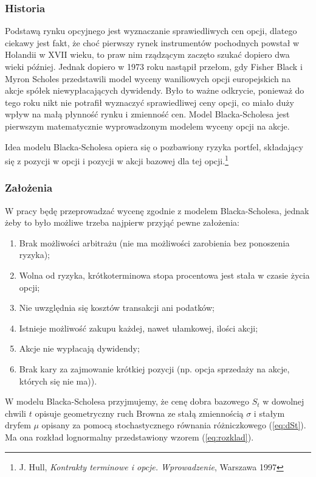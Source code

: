 \documentclass[12pt]{article}
\begin{document}
\subsubsection{Historia}
Podstawą rynku opcyjnego jest wyznaczanie sprawiedliwych cen opcji, dlatego ciekawy jest fakt, że choć pierwszy rynek instrumentów pochodnych powstał w Holandii w XVII wieku, to praw nim rządzącym zaczęto szukać dopiero dwa wieki później. Jednak dopiero w 1973 roku nastąpił przełom, gdy Fisher Black i Myron Scholes przedstawili model wyceny waniliowych opcji europejskich na akcje spółek niewypłacających dywidendy. Było to ważne odkrycie, ponieważ do tego roku nikt nie potrafił wyznaczyć sprawiedliwej ceny opcji, co miało duży wpływ na małą płynność rynku i zmienność cen. Model Blacka-Scholesa jest pierwszym matematycznie wyprowadzonym modelem wyceny opcji na akcje.

Idea modelu Blacka-Scholesa opiera się o pozbawiony ryzyka portfel, składający się z pozycji w opcji i pozycji w akcji bazowej dla tej opcji.\footnote{J. Hull, \textit{Kontrakty terminowe i opcje. Wprowadzenie}, Warszawa 1997}

\subsubsection{Założenia}

W pracy będę przeprowadzać wycenę zgodnie z modelem Blacka-Scholesa, jednak żeby to było możliwe trzeba najpierw przyjąć pewne założenia: 

\begin{enumerate}
\item Brak możliwości arbitrażu (nie ma możliwości zarobienia bez ponoszenia ryzyka);
\item Wolna od ryzyka, krótkoterminowa stopa procentowa jest stała w czasie życia opcji;
\item Nie uwzględnia się kosztów transakcji ani podatków;
\item Istnieje możliwość zakupu każdej, nawet ułamkowej, ilości akcji;
\item Akcje nie wypłacają dywidendy;
\item Brak kary za zajmowanie krótkiej pozycji (np. opcja sprzedaży na akcje, których się nie ma)).
\end{enumerate}
W modelu Blacka-Scholesa przyjmujemy, że cenę dobra bazowego $S_t$ w dowolnej chwili $t$ opisuje geometryczny ruch Browna ze stałą zmiennością $\sigma$ i  stałym dryfem $\mu$ opisany za pomocą stochastycznego równania różniczkowego (\ref{eq:dSt}). Ma ona rozkład lognormalny przedstawiony wzorem (\ref{eq:rozklad}).
\end{document}
